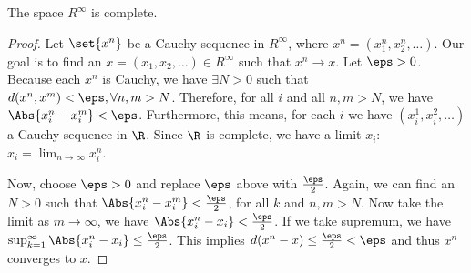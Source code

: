 \documentclass[12pt,letterpaper,twoside]{hmcpset}
\begin{document}
\begin{problem}
  The space $R^\infty$ is complete.
\end{problem}

\begin{solution}
  \begin{proof}
    Let $\set{x^n}$ be a Cauchy sequence in $R^\infty$, where $x^n = (x_1^n, x_2^n, \dotsc)$.
    Our goal is to find an $x = (x_1, x_2, \dotsc) \in R^\infty$ such that $x^n \to x$.
    Let $\eps > 0$.
    Because each $x^n$ is Cauchy, we have $\exists N > 0$ such that $d(x^n,x^m) < \eps, \forall n,m > N$.
    Therefore, for all $i$ and all $n,m > N$, we have $\Abs{x^n_i - x^m_i} < \eps$.
    Furthermore, this means, for each $i$ we have $(x^1_i, x^2_i, \dotsc)$ a Cauchy sequence in $\R$.
    Since $\R$ is complete, we have a limit $x_i$: $x_i = \lim_{n\to\infty}x^n_i$.
    
    Now, choose $\eps > 0$ and replace $\eps$ above with $\frac{\eps}{2}$.
    Again, we can find an $N > 0$ such that $\Abs{x_i^n - x_i^m} < \frac{\eps}{2}$, for all $k$ and $n,m > N$.
    Now take the limit as $m \to \infty$, we have $\Abs{x_i^n - x_i} < \frac{\eps}{2}$.
    If we take supremum, we have $\sup_{k=1}^\infty\Abs{x_i^n - x_i} \leq \frac{\eps}{2}$.
    This implies $d(x^n - x) \leq \frac{\eps}{2} < \eps$ and thus $x^n$ converges to $x$.
    
  \end{proof}
\end{solution}
\end{document}
